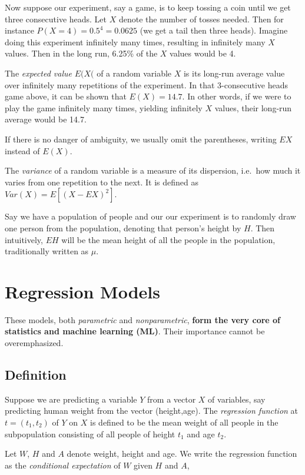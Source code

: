 Now suppose our experiment, say a game, is to keep tossing a coin until
we get three consecutive heads.  Let $X$ denote the number of tosses
needed.  Then for instance $P(X = 4) = 0.5^4 = 0.0625$ (we get a tail
then three heads).  Imagine doing this experiment infinitely many times,
resulting in infinitely many $X$ values.  Then in the long run, 6.25\%
of the $X$ values would be 4.

The \textit{expected value} $E(X($ of a random variable $X$ is its long-run
average value over infinitely many repetitions of the experiment.  In
that 3-consecutive heads game above, it can be shown that $E(X) = 14.7$.
In other words, if we were to play the game infinitely many times,
yielding infinitely $X$ values, their long-run average would be 14.7.

If there is no danger of ambiguity, we usually omit the parentheses,
writing $EX$ instead of $E(X)$.

The \textit{variance} of a random variable is a measure of its
dispersion, i.e.\ how much it varies from one repetition to the next.
It is defined as $Var(X) = E[(X - EX)^2]$.

Say we have a population of people and our our experiment is to 
randomly draw one person from the population, denoting that person's
height by $H$.  Then intuitively, $EH$ will be the mean height of all
the people in the population, traditionally written as $\mu$.

\section{Regression Models} 

These models, both \textit{parametric} and \textit{nonparametric},
\textbf{form the very core of statistics and machine learning (ML)}.  Their
importance cannot be overemphasized.

\subsection{Definition}

Suppose we are predicting a variable $Y$ from a vector $X$ of variables,
say predicting human weight from the vector (height,age).  The
\textit{regression function} at $t = (t_1,t_2)$ of $Y$ on $X$ is defined
to be the mean weight of all people in the subpopulation consisting of
all people of height $t_1$ and age $t_2$.

Let $W$, $H$ and $A$ denote weight, height and age.  We write the
regression function as the \textit{conditional expectation} of $W$ given
$H$ and $A$, 

